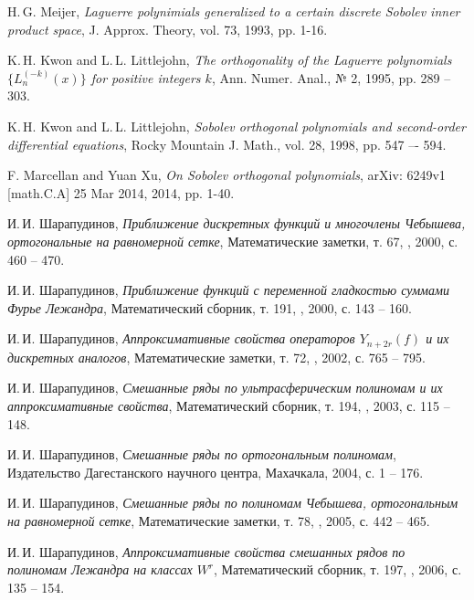 H.\,G. Meijer,
\textit{Laguerre polynimials generalized to a certain discrete Sobolev inner product space},
J. Approx. Theory, vol. 73, 1993, pp. 1-16.


K.\,H. Kwon and L.\,L. Littlejohn,
\textit{The orthogonality of the Laguerre polynomials $\{L_n^{(-k)}(x)\}$ for positive integers $k$},
Ann. Numer. Anal., № 2, 1995, pp. 289 -- 303.

 K.\,H. Kwon and L.\,L. Littlejohn,
\textit{Sobolev orthogonal polynomials and second-order differential equations}, Rocky Mountain J. Math.,
vol. 28, 1998, pp. 547 –- 594.

F. Marcellan and Yuan Xu,
\textit{On Sobolev orthogonal polynomials},
arXiv: 6249v1 [math.C.A] 25 Mar 2014, 2014, pp. 1-40.

 И.\,И. Шарапудинов,
\textit{Приближение дискретных функций и многочлены Чебышева, ортогональные на равномерной сетке},
Математические заметки, т. 67, , 2000, с. 460 -- 470.

И.\,И. Шарапудинов,
\textit{Приближение функций с переменной гладкостью суммами Фурье Лежандра},
Математический сборник, т. 191, , 2000, с. 143 -- 160.


И.\,И. Шарапудинов,
\textit{Аппроксимативные свойства операторов $\textit{Y}_{n+2r}(f)$ и их дискретных аналогов},
Математические заметки, т. 72, , 2002, с. 765 -- 795.

И.\,И. Шарапудинов,
\textit{Смешанные ряды по ультрасферическим полиномам и их аппроксимативные свойства},
Математический сборник, т. 194, , 2003, с. 115 -- 148.

И.\,И. Шарапудинов,
\textit{Смешанные ряды по ортогональным полиномам},
Издательство Дагестанского научного центра, Махачкала, 2004, с. 1 -- 176.


И.\,И. Шарапудинов,
\textit{Смешанные ряды по полиномам Чебышева, ортогональным на равномерной сетке},
Математические заметки, т. 78, , 2005, с. 442 -- 465.


И.\,И. Шарапудинов,
\textit{Аппроксимативные свойства смешанных рядов по полиномам Лежандра на классах $W^r$},
Математический сборник, т. 197, , 2006, с. 135 -- 154.

